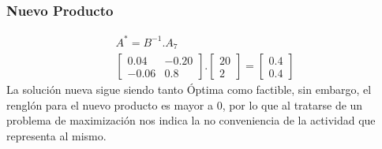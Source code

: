 \begin{homeworkProblem}[-1][Laboratorio]
\subsubsection{Nuevo Producto}
\begin{align*}
A^{*}=B^{-1}.A_7\\
    \begin{bmatrix}
        0.04 & -0.20 \\
        -0.06 & 0.8
    \end{bmatrix}.
    \begin{bmatrix}
        20 \\
        2        
    \end{bmatrix}=
    \begin{bmatrix}
        0.4 \\
        0.4
    \end{bmatrix}
\end{align*}
La solución nueva sigue siendo tanto Óptima como factible, sin embargo, el renglón \zero para el nuevo producto es mayor a $0$, por lo que al tratarse de un problema de maximización nos indica la no conveniencia de la actividad que representa al mismo.
\end{homeworkProblem}